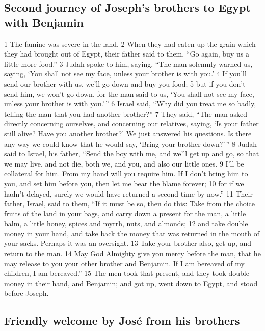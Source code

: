 \hypertarget{second-journey-of-josephs-brothers-to-egypt-with-benjamin}{%
\subsection{Second journey of Joseph's brothers to Egypt with
Benjamin}\label{second-journey-of-josephs-brothers-to-egypt-with-benjamin}}

{1} The famine was severe in the land. {2} When they had eaten up the
grain which they had brought out of Egypt, their father said to them,
``Go again, buy us a little more food.'' {3} Judah spoke to him, saying,
``The man solemnly warned us, saying, `You shall not see my face, unless
your brother is with you.' {4} If you'll send our brother with us, we'll
go down and buy you food; {5} but if you don't send him, we won't go
down, for the man said to us, `You shall not see my face, unless your
brother is with you.'\,'' {6} Israel said, ``Why did you treat me so
badly, telling the man that you had another brother?'' {7} They said,
``The man asked directly concerning ourselves, and concerning our
relatives, saying, `Is your father still alive? Have you another
brother?' We just answered his questions. Is there any way we could know
that he would say, `Bring your brother down?'\,'' {8} Judah said to
Israel, his father, ``Send the boy with me, and we'll get up and go, so
that we may live, and not die, both we, and you, and also our little
ones. {9} I'll be collateral for him. From my hand will you require him.
If I don't bring him to you, and set him before you, then let me bear
the blame forever; {10} for if we hadn't delayed, surely we would have
returned a second time by now.'' {11} Their father, Israel, said to
them, ``If it must be so, then do this: Take from the choice fruits of
the land in your bags, and carry down a present for the man, a little
balm, a little honey, spices and myrrh, nuts, and almonds; {12} and take
double money in your hand, and take back the money that was returned in
the mouth of your sacks. Perhaps it was an oversight. {13} Take your
brother also, get up, and return to the man. {14} May God Almighty give
you mercy before the man, that he may release to you your other brother
and Benjamin. If I am bereaved of my children, I am bereaved.'' {15} The
men took that present, and they took double money in their hand, and
Benjamin; and got up, went down to Egypt, and stood before Joseph.

\hypertarget{friendly-welcome-by-josuxe9-from-his-brothers}{%
\subsection{Friendly welcome by José from his
brothers}\label{friendly-welcome-by-josuxe9-from-his-brothers}}

